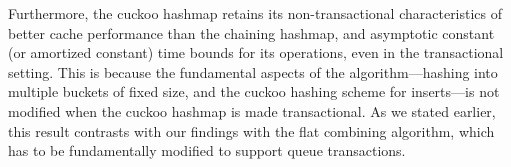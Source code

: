 Furthermore, the cuckoo hashmap retains its non-transactional characteristics of better cache performance than the chaining hashmap, and asymptotic constant (or amortized constant) time bounds for its operations, even in the transactional setting. This is because the fundamental aspects of the algorithm---hashing into multiple buckets of fixed size, and the cuckoo hashing scheme for inserts---is not modified when the cuckoo hashmap is made transactional. As we stated earlier, this result contrasts with our findings with the flat combining algorithm, which has to be fundamentally modified to support queue transactions.


